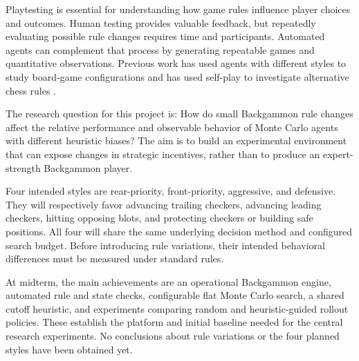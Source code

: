 Playtesting is essential for understanding how game rules influence player choices and outcomes. Human testing provides valuable feedback, but repeatedly evaluating possible rule changes requires time and participants. Automated agents can complement that process by generating repeatable games and quantitative observations. Previous work has used agents with different styles to study board-game configurations and has used self-play to investigate alternative chess rules \cite{silva2017,tomasev2020}.

The research question for this project is: How do small Backgammon rule changes affect the relative performance and observable behavior of Monte Carlo agents with different heuristic biases? The aim is to build an experimental environment that can expose changes in strategic incentives, rather than to produce an expert-strength Backgammon player.

Four intended styles are rear-priority, front-priority, aggressive, and defensive. They will respectively favor advancing trailing checkers, advancing leading checkers, hitting opposing blots, and protecting checkers or building safe positions. All four will share the same underlying decision method and configured search budget. Before introducing rule variations, their intended behavioral differences must be measured under standard rules.

At midterm, the main achievements are an operational Backgammon engine, automated rule and state checks, configurable flat Monte Carlo search, a shared cutoff heuristic, and experiments comparing random and heuristic-guided rollout policies. These establish the platform and initial baseline needed for the central research experiments. No conclusions about rule variations or the four planned styles have been obtained yet.
